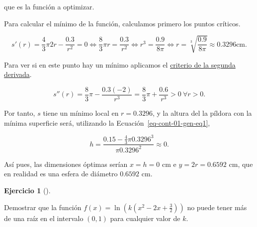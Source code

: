 \documentclass[
  spanish,
  a4paper,
]{scrreport}
\theoremstyle{definition}
\newtheorem{exercise}{Ejercicio}[chapter]
\theoremstyle{remark}
\begin{document}
\begin{tcolorbox}
que es la función a optimizar.

Para calcular el mínimo de la función, calculamos primero los puntos
críticos.

\[
s'(r) = \frac{4}{3}\pi 2r -\frac{0.3}{r^2} =0 \Leftrightarrow \frac{8}{3}\pi r = \frac{0.3}{r^2} \Leftrightarrow r^3 = \frac{0.9}{8\pi} \Leftrightarrow r = \sqrt[3]{\frac{0.9}{8\pi}} \approx 0.3296 \mbox{cm}.
\]

Para ver si en este punto hay un mínimo aplicamos el
\href{https://aprendeconalf.es/analisis-manual/derivadas.html\#thm-concavidad}{criterio
de la segunda derivada}.

\[
s''(r) = \frac{8}{3}\pi -\frac{0.3(-2)}{r^3} =\frac{8}{3}\pi+\frac{0.6}{r^3} >0\ \forall r>0.
\]

Por tanto, \(s\) tiene un mínimo local en \(r=0.3296\), y la altura del
la píldora con la mínima superficie será, utilizando la
Ecuación~\ref{eq-cont-01-gen-eq1},

\[h =\frac{0.15-\frac{4}{3}\pi 0.3296^3}{\pi 0.3296^2}\approx 0.\]

Así pues, las dimensiones óptimas serían \(x=h=0\) cm e \(y=2r=0.6592\)
cm, que en realidad es una esfera de diámetro \(0.6592\) cm.

\end{tcolorbox}

\begin{exercise}[]\protect\hypertarget{exr-9}{}\label{exr-9}

Demostrar que la función
\(f(x)=\ln\left(k\left(x^2-2x+\frac{3}{2}\right)\right)\) no puede tener
más de una raíz en el intervalo \((0,1)\) para cualquier valor de \(k\).

\end{exercise}
\end{document}
